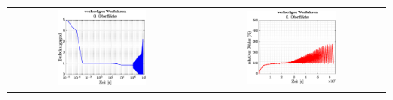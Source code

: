 \documentclass{listhesis}
\begin{document}

\clearpage
\newcommand\wsss{0.5}
\begin{figure}[!h]
\centering
\begin{tabular}{@{}cc@{}}
\includegraphics[width=\wsss\textwidth]{./include/figure_5.0/old/CovFacet0.eps}&
\includegraphics[width=\wsss\textwidth]{./include/figure_5.0/old/CovFacetError0.eps}\\

\end{tabular}
\end{figure}
\end{document}
